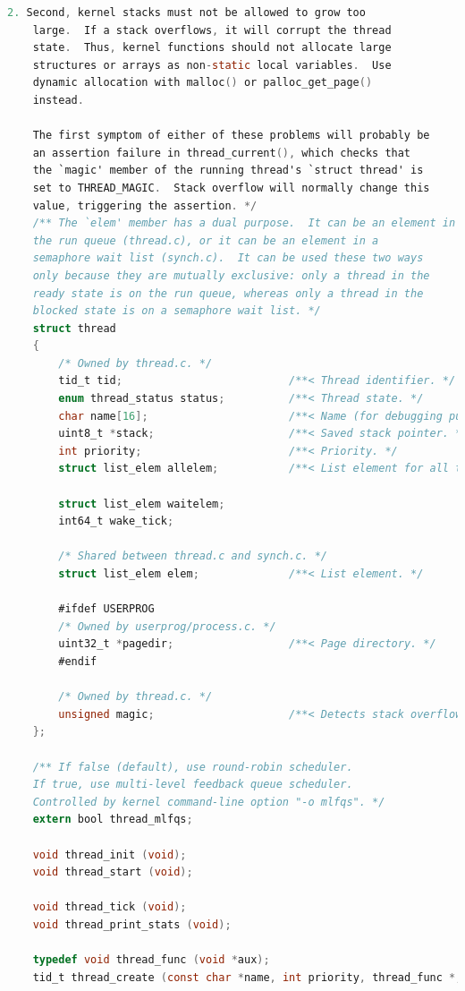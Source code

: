 \documentclass{article}
\begin{document}
\begin{lstlisting}[language=C, title=\texttt{pintos/src/threads/thread.h}]
	2. Second, kernel stacks must not be allowed to grow too
	large.  If a stack overflows, it will corrupt the thread
	state.  Thus, kernel functions should not allocate large
	structures or arrays as non-static local variables.  Use
	dynamic allocation with malloc() or palloc_get_page()
	instead.
	
	The first symptom of either of these problems will probably be
	an assertion failure in thread_current(), which checks that
	the `magic' member of the running thread's `struct thread' is
	set to THREAD_MAGIC.  Stack overflow will normally change this
	value, triggering the assertion. */
	/** The `elem' member has a dual purpose.  It can be an element in
	the run queue (thread.c), or it can be an element in a
	semaphore wait list (synch.c).  It can be used these two ways
	only because they are mutually exclusive: only a thread in the
	ready state is on the run queue, whereas only a thread in the
	blocked state is on a semaphore wait list. */
	struct thread
	{
		/* Owned by thread.c. */
		tid_t tid;                          /**< Thread identifier. */
		enum thread_status status;          /**< Thread state. */
		char name[16];                      /**< Name (for debugging purposes). */
		uint8_t *stack;                     /**< Saved stack pointer. */
		int priority;                       /**< Priority. */
		struct list_elem allelem;           /**< List element for all threads list. */
		
		struct list_elem waitelem;
		int64_t wake_tick;
		
		/* Shared between thread.c and synch.c. */
		struct list_elem elem;              /**< List element. */
		
		#ifdef USERPROG
		/* Owned by userprog/process.c. */
		uint32_t *pagedir;                  /**< Page directory. */
		#endif
		
		/* Owned by thread.c. */
		unsigned magic;                     /**< Detects stack overflow. */
	};
	
	/** If false (default), use round-robin scheduler.
	If true, use multi-level feedback queue scheduler.
	Controlled by kernel command-line option "-o mlfqs". */
	extern bool thread_mlfqs;
	
	void thread_init (void);
	void thread_start (void);
	
	void thread_tick (void);
	void thread_print_stats (void);
	
	typedef void thread_func (void *aux);
	tid_t thread_create (const char *name, int priority, thread_func *, void *);
	

\end{lstlisting}
\end{document}
